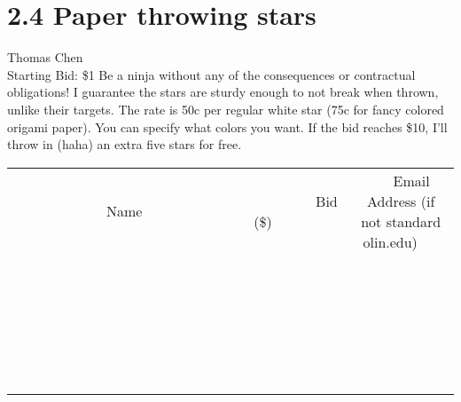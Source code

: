\documentclass[11pt]{article}
\begin{document}
\section*{2.4 Paper throwing stars}
Thomas Chen
\\
Starting Bid: \$1
\newline
Be a ninja without any of the consequences or contractual obligations! I guarantee the stars are sturdy enough to not break when thrown, unlike their targets. The rate is 50c per regular white star (75c for fancy colored origami paper). You can specify what colors you want. If the bid reaches \$10, I'll throw in (haha) an extra five stars for free.
\\[6ex]
\begin{tabular}{c c c}
~~~~~~~~~~~~~Name~~~~~~~~~~~~~ & ~~~~~~~~~Bid (\$)~~~~~~~~~  & ~~~Email Address (if not standard olin.edu)~~~\\
 & & \\
\hline
 & & \\
\hline
 & & \\
\hline
 & & \\
\hline
 & & \\
\hline
 & & \\
\hline
 & & \\
\hline
 & & \\
\hline
 & & \\
\hline
 & & \\
\hline
 & & \\
\hline
 & & \\
\hline
 & & \\
\hline
 & & \\
\hline
 & & \\
\hline
 & & \\
\hline
 & & \\
\hline
 & & \\
\hline
 & & \\
\hline
 & & \\
\hline
 & & \\
\hline
 & & \\
\hline
 & & \\
\hline
 & & \\
\hline
 & & \\
\hline
 & & \\
\hline
\end{tabular}
\newpage
\end{document}
